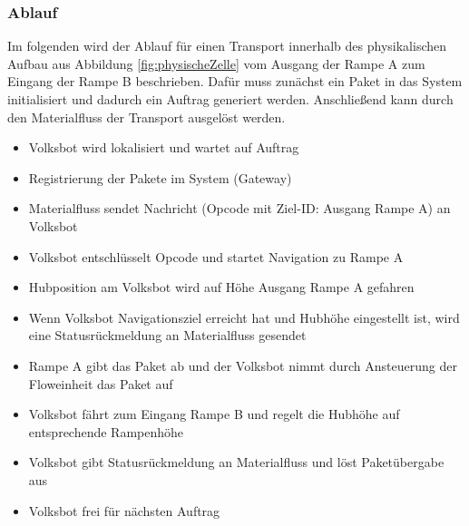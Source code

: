 \subsubsection{Ablauf}

Im folgenden wird der Ablauf für einen Transport innerhalb des physikalischen Aufbau aus Abbildung \ref{fig:physischeZelle} vom Ausgang der Rampe A zum Eingang der Rampe B beschrieben. Dafür muss zunächst ein Paket in das System initialisiert und dadurch ein Auftrag generiert werden. Anschließend kann durch den Materialfluss der Transport ausgelöst werden.

\begin{itemize}
\item Volksbot wird lokalisiert und wartet auf Auftrag
\item Registrierung der Pakete im System (Gateway)
\item Materialfluss sendet Nachricht (Opcode mit Ziel-ID: Ausgang Rampe A) an Volksbot
\item Volksbot entschlüsselt Opcode und startet Navigation zu Rampe A
\item Hubposition am Volksbot wird auf Höhe Ausgang Rampe A gefahren
\item Wenn Volksbot Navigationsziel erreicht hat und Hubhöhe eingestellt ist, wird eine Statusrückmeldung an Materialfluss gesendet
\item Rampe A gibt das Paket ab und der Volksbot nimmt durch Ansteuerung der Floweinheit das Paket auf
\item Volksbot fährt zum Eingang Rampe B und regelt die Hubhöhe auf entsprechende Rampenhöhe
\item Volksbot gibt Statusrückmeldung an Materialfluss und löst Paketübergabe aus
\item Volksbot frei für nächsten Auftrag


\end{itemize}
